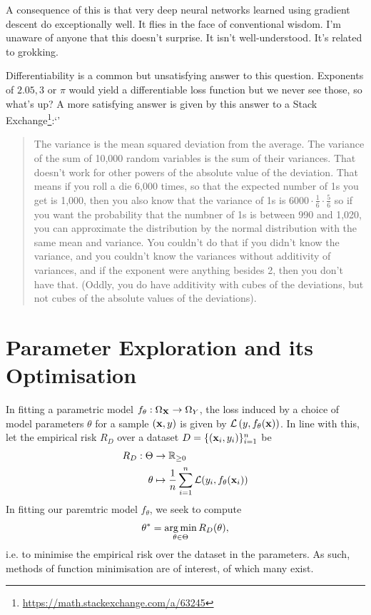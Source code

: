 \documentclass[11pt]{article}
\begin{document}
A consequence of this is that very deep neural networks learned using gradient descent do exceptionally well. It flies in the face of conventional wisdom. I'm unaware of anyone that this doesn't surprise. It isn't well-understood. It's related to grokking.

\begin{tcolorbox}[title={\centering\textbf{What makes MSE so special in general?}}, colback=myLightBlue, colbacktitle=myDarkBlue, colframe=myDarkBlue, coltitle=white]
    Differentiability is a common but unsatisfying answer to this question. Exponents of $2.05, 3$ or $\pi$ would yield a differentiable loss function but we never see those, so what's up? A more satisfying answer is given by this answer to a Stack Exchange\footnote{\url{https://math.stackexchange.com/a/63245}}:`'
    \begin{quote}
        The variance is the mean squared deviation from the average. The variance of the sum of 10,000 random variables is the sum of their variances. That doesn't work for other powers of the absolute value of the deviation. That means if you roll a die 6,000 times, so that the expected number of 1s you get is 1,000, then you also know that the variance of 1s is $6000\cdot\frac{1}{6}\cdot\frac{5}{6}$ so if you want the probability that the numbner of 1s is between 990 and 1,020, you can approximate the distribution by the normal distribution with the same mean and variance. You couldn't do that if you didn't know the variance, and you couldn't know the variances without additivity of variances, and if the exponent were anything besides 2, then you don't have that. (Oddly, you do have additivity with cubes of the deviations, but not cubes of the absolute values of the deviations).
    \end{quote}
\end{tcolorbox}

\section{Parameter Exploration and its Optimisation}
In fitting a parametric model $f_{\theta}:\Omega_{\mathbf{X}}\to\Omega_{Y}$, the loss induced by a choice of model parameters $\theta$ for a sample $(\mathbf{x},y)$ is given by $\mathcal{L}\left(y,f_{\theta}(\mathbf{x})\right)$. In line with this, let the empirical risk $R_D$ over a dataset $D=\{(\mathbf{x}_i,y_i)\}_{i=1}^n$ be
\begin{align*}
    R_D:\Theta&\to\mathbb{R}_{\geq0}\\
    \theta&\mapsto\frac{1}{n}\sum_{i=1}^n\mathcal{L}(y_i,f_{\theta}(\mathbf{x}_i))
\end{align*}
In fitting our paremtric model $f_{\theta}$, we seek to compute
$$
\theta^{*}
=
\operatorname*{arg\,min}_{\theta\in\Theta}R_D(\theta),
$$
i.e. to minimise the empirical risk over the dataset in the parameters. As such, methods of function minimisation are of interest, of which many exist.
\end{document}
